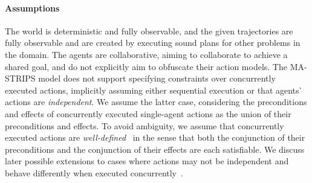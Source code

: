 \documentclass[letterpaper]{article} %
\theoremstyle{definition}
\theoremstyle{remark}
\begin{document}
\paragraph{Assumptions}
The world is deterministic and fully observable, and the given trajectories are fully observable and are created by executing sound plans for other problems in the domain. 
The agents are collaborative, aiming to collaborate to achieve a shared goal, and do not explicitly aim to obfuscate their action models. %
The MA-STRIPS model does not support specifying constraints over concurrently executed actions, implicitly assuming either sequential execution or that agents' actions are \emph{independent}. 
We assume the latter case, considering the preconditions and effects of concurrently executed single-agent actions as the union of their preconditions and effects. 
To avoid ambiguity, we assume that concurrently executed actions are \emph{well-defined}~\cite{crosby2014single} in the sense that both the conjunction of their preconditions and the conjunction of their effects are each satisfiable. %
We discuss later possible extensions to cases where actions may not be independent and behave differently when executed concurrently~\cite{boutilier2001partial}.



\end{document}
